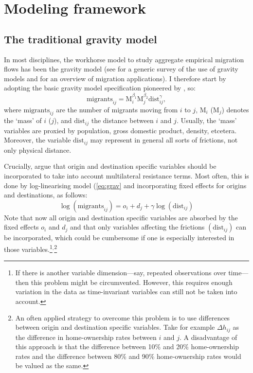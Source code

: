 \documentclass[11pt,parskip,abstracton,notitlepage, dvipsnames]{scrartcl}
\begin{document}
\section{Modeling framework}

\subsection{The traditional gravity model}

In most disciplines, the workhorse model to study aggregate empirical migration
flows has been the gravity model (see \citet{anderson2011gravity} for a generic
survey of the use of gravity models and \citet{poot2016gravity} for an overview
of migration applications). I therefore start by adopting the basic gravity
model specification pioneered by \citet{tinbergen1962shaping}, so:
\begin{equation}
  \text{migrants}_{ij} = \text{M}_i^{\beta_1}\text{M}_j^{\beta_2}\text{dist}_{ij}^\gamma,
  \label{eq:grav}
\end{equation}
where $\text{migrants}_{ij}$ are the number of migrants moving from $i$ to $j$,
$\text{M}_i$ ($\text{M}_j$) denotes the `mass' of $i$ ($j$), and
$\text{dist}_{ij}$ the distance between $i$ and $j$. Usually, the `mass'
variables are proxied by population, gross domestic product, density, etcetera.
Moreover, the variable $\text{dist}_{ij}$ may represent in general all sorts of
frictions, not only physical distance.

Crucially, \citet{anderson2003gravity} argue that origin and destination
specific variables should be incorporated to take into account multilateral
resistance terms. Most often, this is done by log-linearising model
(\ref{eq:grav} and incorporating fixed effects for origins and destinations, as
follows:
\begin{equation}
  \log(\text{migrants}_{ij}) = o_i + d_j +  \gamma\log(\text{dist}_{ij})
  \label{eq:gravfixed}
\end{equation}
Note that now all origin and destination specific variables are absorbed by the
fixed effects $o_i$ and $d_j$ and that only variables affecting the frictions
$(\text{dist}_{ij})$ can be incorporated, which could be cumbersome if one is
especially interested in those variables.\footnote{If there is another variable
  dimension---say, repeated observations over time---then this problem might be
  circumvented. However, this requires enough variation in the data as
  time-invariant variables can still not be taken into account.}$^{,}$\footnote{An
  often applied strategy to overcome this problem is to use differences between
  origin and destination specific variables. Take for example $\Delta h_{ij}$ as
  the difference in home-ownership rates between $i$ and $j$. A disadvantage of
  this approach is that the difference between 10\% and 20\% home-ownership
  rates and the difference between 80\% and 90\% home-ownership rates would be
  valued as the same.}
\end{document}
